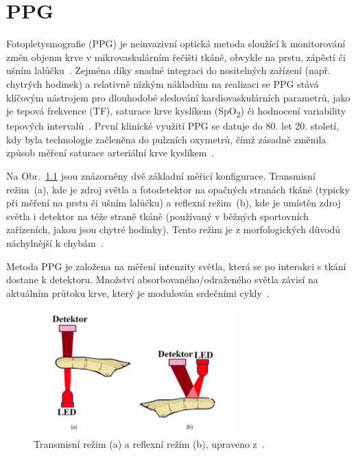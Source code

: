 \chapter{\acl{PPG}}
\label{chap:PPG_teorie}

Fotopletysmografie (\acs{PPG}) je neinvazivní optická metoda sloužící k monitorování změn objemu krve v mikrovaskulárním řečišti tkáně, obvykle na prstu, zápěstí či ušním lalůčku~\cite{Park2022}.
Zejména díky snadné integraci do nositelných zařízení (např. chytrých hodinek) a relativně nízkým nákladům na realizaci se \acs{PPG} stává klíčovým nástrojem pro dlouhodobé sledování kardiovaskulárních parametrů,
jako je tepová frekvence (\acs{TF}), saturace krve kyslíkem (SpO\textsubscript{2}) či hodnocení variability tepových intervalů~\cite{Orphanidou2018}.
První klinické využití \acs{PPG} se datuje do 80. let 20. století, kdy byla technologie začleněna do pulzních oxymetrů, čímž zásadně změnila způsob měření saturace arteriální krve kyslíkem~\cite{Charlton2023}.

Na Obr.~\ref{fig:snimaniPPG} jsou znázorněny dvě základní měřicí konfigurace.
Transmisní režim~(a), kde je zdroj světla a fotodetektor na opačných stranách tkáně (typicky při měření na prstu či ušním lalůčku) a reflexní režim~(b), kde je umístěn zdroj světla i detektor na téže straně tkáně (používaný v běžných sportovních zařízeních, jakou jsou chytré hodinky).
Tento režim je z morfologických důvodů náchylnější k chybám~\cite{Peralta2017}.

Metoda \acs{PPG} je založena na měření intenzity světla, která se po interakci s tkání dostane k detektoru.
Množství absorbovaného/odraženého světla závisí na aktuálním průtoku krve, který je modulován srdečními cykly~\cite{Park2022}.

\begin{figure}[h]
	\centering
	\includegraphics[width=0.7\textwidth]{./obrazky/snimaniPPG.png}
	\caption[Snímání PPG signálu]{Transmisní režim (a) a reflexní režim (b), upraveno z~\cite{ENIKÖ}.}
	\label{fig:snimaniPPG}
\end{figure}

